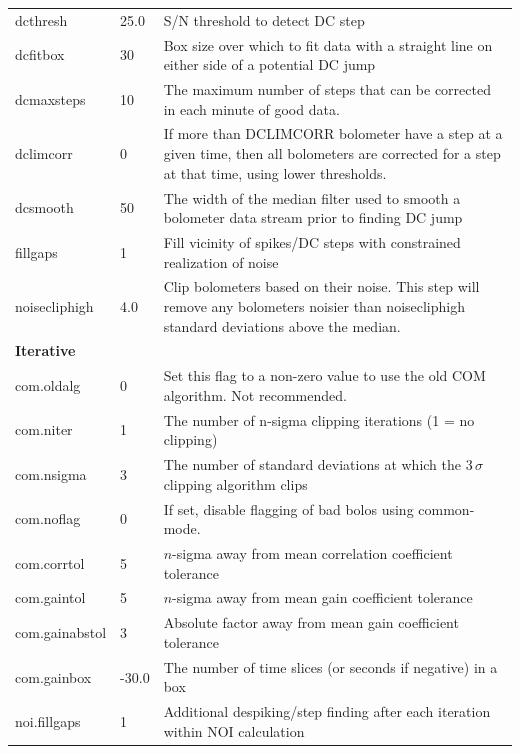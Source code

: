 \documentclass[twoside,11pt]{article}
\newcounter{box}
\renewcommand{\_}{\texttt{\symbol{95}}}
\begin{document}
\begin{table}
\begin{center}
\begin{footnotesize}
\begin{tabular}{|p{2.2cm}|p{1.1cm}|p{11.4cm}|}
dcthresh      &  25.0 & S/N threshold to detect DC step\\
dcfitbox      &    30 & Box size over which to fit data with a straight
                        line on either side of a potential DC jump\\
dcmaxsteps    &    10 & The maximum number of steps that can be corrected
                        in each minute of good data.\\
dclimcorr     &     0 & If more than DCLIMCORR bolometer have a step at
                        a given time, then all bolometers are corrected for
                        a step at that time, using lower thresholds.\\
dcsmooth      &    50 & The width of the median filter used to smooth a
                        bolometer data stream prior to finding DC jump\\
fillgaps      &     1 & Fill vicinity of spikes/DC steps with constrained
                        realization of noise\\
noisecliphigh &   4.0 & Clip bolometers based on their noise. This step
                        will remove any bolometers noisier than noisecliphigh
                        standard deviations above the median.\\
\hline
\multicolumn{3}{|l|}{\textbf{Iterative}}\\
\hline
com.oldalg       &    0 & Set this flag to a non-zero value to use the old COM
                          algorithm. Not recommended.\\
com.niter        &    1 & The number of n-sigma clipping iterations (1 = no clipping)\\
com.nsigma       &    3 & The number of standard deviations at which the 3\,$\sigma$
                           clipping algorithm clips\\
com.noflag       &    0 & If set, disable flagging of bad bolos using common-mode.\\
com.corr\_tol    &    5 & $n$-sigma away from mean correlation coefficient tolerance\\
com.gain\_tol    &    5 & $n$-sigma away from mean gain coefficient tolerance\\
com.gain\_abstol &    3 & Absolute factor away from mean gain coefficient tolerance\\
com.gain\_box    &-30.0 & The number of time slices (or seconds if negative)
                          in a box\\
\hline
noi.fillgaps     &    1 & Additional despiking/step finding after each iteration within NOI calculation\\

\end{tabular}
\end{footnotesize}
\end{center}
\end{table}
\end{document}
